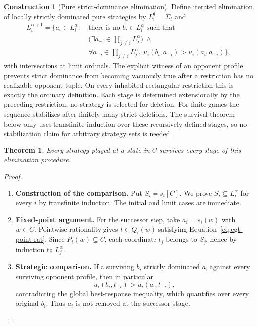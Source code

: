 \documentclass[11pt,a4paper]{article}
\numberwithin{equation}{section}
\newtheorem{theorem}{Theorem}[section]
\theoremstyle{definition}
\newtheorem{construction}[construction]{Construction}
\theoremstyle{remark}
\theoremstyle{plain}
\begin{document}
\begin{construction}[Pure strict-dominance elimination]
Define iterated elimination of locally strictly dominated pure strategies by
$L_i^0=\Sigma_i$ and
\begin{align*}
 L_i^{\alpha+1}=\{a_i\in L_i^\alpha:
  \ &\text{there is no }b_i\in L_i^\alpha\text{ such that}\\[-2pt]
  &\bigl(\exists a_{-i}\in\prod_{j\ne i}L_j^\alpha\bigr)\ \wedge\\[-2pt]
  &\forall a_{-i}\in\prod_{j\ne i}L_j^\alpha,
       \ u_i(b_i,a_{-i})>u_i(a_i,a_{-i})\},
\end{align*}
with intersections at limit ordinals. The explicit witness of an opponent
profile prevents strict dominance from becoming vacuously true after a
restriction has no realizable opponent tuple. On every inhabited rectangular
restriction this is exactly the ordinary definition. Each stage is determined
extensionally by the preceding restriction; no strategy is selected for
deletion. For finite games the sequence stabilizes after finitely many strict
deletions. The survival theorem below only uses transfinite induction over
these recursively defined stages, so no stabilization claim for arbitrary
strategy sets is needed.
\end{construction}

\begin{theorem}
\label{thm:egt-rationality}
Every strategy played at a state in $C$ survives every stage of this
elimination procedure.
\end{theorem}
\begin{proof}
\leavevmode
\begin{enumerate}[label=\textup{(\arabic*)},leftmargin=*,itemsep=4pt,topsep=3pt]
  \item \textbf{Construction of the comparison.} Put $S_i=s_i[C]$. We prove $S_i\subseteq L_i^\alpha$ for every $i$ by
transfinite induction. The initial and limit cases are immediate.
  \item \textbf{Fixed-point argument.} For the
successor step, take $a_i=s_i(w)$ with $w\in C$. Pointwise rationality gives
$t\in Q_i(w)$ satisfying Equation~\eqref{eq:egt-point-rat}. Since
$P_i(w)\subseteq C$, each coordinate $t_j$ belongs to $S_j$, hence by
induction to $L_j^\alpha$.
  \item \textbf{Strategic comparison.} If a surviving $b_i$ strictly dominated $a_i$
against every surviving opponent profile, then in particular
\[
 u_i(b_i,t_{-i})>u_i(a_i,t_{-i}),
\]
contradicting the global best-response inequality, which quantifies over every
original $b_i$. Thus $a_i$ is not removed at the successor stage.
\end{enumerate}
\end{proof}
\end{document}
